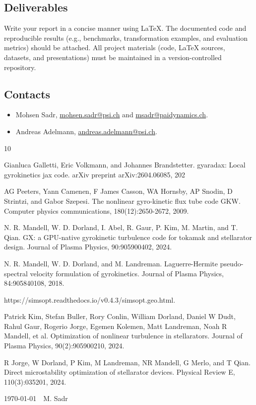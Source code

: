 \documentclass[11pt,a4paper,oneside]{article}
\begin{document}
\subsection*{Deliverables}

Write your report in a concise manner using \LaTeX. The documented code and reproducible results (e.g., benchmarks, transformation examples, and evaluation metrics) should be attached. All project materials (code, \LaTeX{} sources, datasets, and presentations) must be maintained in a version-controlled repository.

\subsection*{Contacts}
\begin{itemize}

\item Mohsen Sadr, \href{mailto:mohsen.sadr@psi.ch}{mohsen.sadr@psi.ch} and \href{mailto:msadr@paidynamics.ch}{msadr@paidynamics.ch}.

\item Andreas Adelmann, \href{mailto:andreas.adelmann@psi.ch}{andreas.adelmann@psi.ch}.

\end{itemize}


\begin{thebibliography}{10}

Gianluca Galletti, Eric Volkmann, and Johannes Brandstetter. gyaradax: Local gyrokinetics jax
code. arXiv preprint arXiv:2604.06085, 202

AG Peeters, Yann Camenen, F James Casson, WA Hornsby, AP Snodin, D Strintzi, and Gabor Szepesi. The nonlinear gyro-kinetic flux tube code GKW. Computer physics communications, 180(12):2650-2672, 2009.

N. R. Mandell, W. D. Dorland, I. Abel, R. Gaur, P. Kim, M. Martin, and T. Qian. GX: a GPU-native gyrokinetic turbulence code for tokamak and stellarator design. Journal of Plasma Physics, 90:905900402, 2024.

N. R. Mandell, W. D. Dorland, and M. Landreman. Laguerre-Hermite pseudo-spectral velocity formulation of gyrokinetics. Journal of Plasma Physics, 84:905840108, 2018.

 https://simsopt.readthedocs.io/v0.4.3/simsopt.geo.html.


Patrick Kim, Stefan Buller, Rory Conlin, William Dorland, Daniel W Dudt, Rahul Gaur, Rogerio Jorge, Egemen Kolemen, Matt Landreman, Noah R Mandell, et al. Optimization of nonlinear turbulence in stellarators. Journal of Plasma Physics, 90(2):905900210, 2024.


R Jorge, W Dorland, P Kim, M Landreman, NR Mandell, G Merlo, and T Qian. Direct microstability optimization of stellarator devices. Physical Review E, 110(3):035201, 2024.

\end{thebibliography}




\vfill\noindent
\today\ \ M. Sadr
\end{document}
